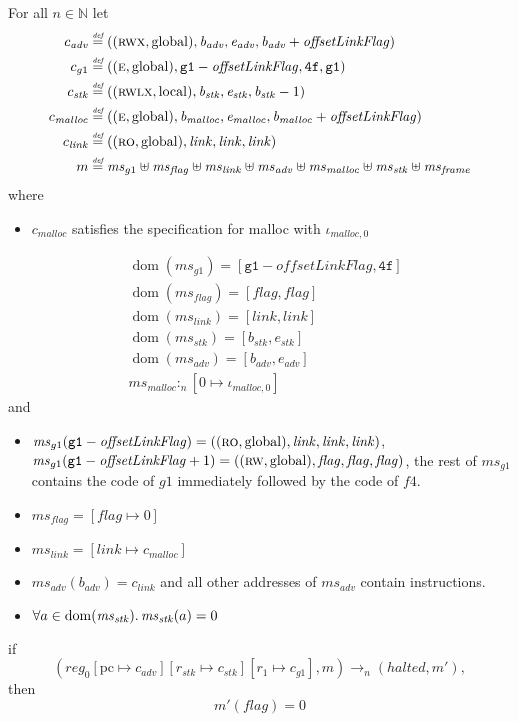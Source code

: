 \documentclass[format=acmsmall, review=true, screen=true]{acmart}
\newcommand{\update}[2]{[#1 \mapsto #2]}
\newcommand{\defeq}{\stackrel{\textit{\tiny{def}}}{=}}
\DeclareMathOperator{\dom}{dom}
\newcommand{\var}[1]{\mathit{#1}}
\newcommand{\hs}{\var{ms}}
\newcommand{\ms}{\hs}
\newcommand{\pcreg}{\mathrm{pc}}
\newcommand{\start}{\var{b}}
\newcommand{\addrend}{\var{e}}
\newcommand{\reg}{\var{reg}}
\newcommand{\heap}{\var{mem}}
\newcommand{\adv}{\var{adv}}
\newcommand{\link}{\var{link}}
\newcommand{\stk}{\var{stk}}
\newcommand{\flag}{\var{flag}}
\newcommand{\pwl}{\var{pwl}}
\newcommand{\olf}{\var{offsetLinkFlag}}
\newcommand{\halted}{\mathit{halted}}
\newcommand{\heapSat}[3][\heap]{#1 :_{#2} #3}
\newcommand{\memSat}[3][n]{\heapSat[#2]{#1}{#3}}
\newcommand{\codelabel}[1]{\mathit{#1}}
\newcommand{\malloc}{\codelabel{malloc}}
\newcommand{\nats}{\mathbb{N}}
\newcommand{\plainperm}[1]{\textsc{#1}}
\newcommand{\readonly}{\plainperm{ro}}
\newcommand{\readwrite}{\plainperm{rw}}
\newcommand{\entry}{\plainperm{e}}
\newcommand{\rwx}{\plainperm{rwx}}
\newcommand{\rwlx}{\plainperm{rwlx}}
\newcommand{\plainlocality}[1]{\mathrm{#1}}
\newcommand{\local}{\plainlocality{local}}
\newcommand{\glob}{\plainlocality{global}}
\newcommand{\step}[1][]{\rightarrow_{#1}}
\begin{document}
 
 \begin{lemma}
  \label{lem:correctness-g1-detailed}
  For all $n \in \nats$
  let
  \begin{align*}
    c_{\var{adv}} & \defeq ((\rwx,\glob),\start_{\adv},\addrend_{\adv},\start_{\adv}+\olf) \\
    c_{g1} & \defeq ((\entry,\glob),\mathtt{g1}-\olf,\mathtt{4f},\mathtt{g1}) \\
    c_\stk & \defeq ((\rwlx,\local),\start_\stk,\addrend_\stk,\start_\stk-1) \\
    c_\malloc & \defeq ((\entry,\glob),\start_\malloc,\addrend_\malloc,\start_\malloc+\olf) \\
    c_\link & \defeq ((\readonly,\glob),\link,\link,\link) \\
    m & \defeq \hs_{g1} \uplus 
        \ms_\flag \uplus                
        \ms_\link \uplus 
        \ms_\adv \uplus 
        \ms_\malloc \uplus 
        \ms_\stk \uplus
        \ms_{\var{frame}} 
  \end{align*}
  where 
  \begin{itemize}
  \item $c_\malloc$ satisfies the specification for malloc with $\iota_{\malloc,0}$
  \end{itemize}
  \begin{align*}
    &\dom(\hs_{g1}) = [\mathtt{g1}-\olf,\mathtt{4f}] \\
    &\dom(\hs_\flag) = [\flag,\flag] \\
    &\dom(\ms_\link) = [\link,\link]\\
    &\dom(\ms_\stk) = [\start_\stk, \addrend_\stk]\\
    &\dom(\hs_{\adv}) = [\start_\adv,\addrend_\adv] \\
    &\heapSat[\hs_{\malloc}]{n}{[0 \mapsto \iota_{\malloc,0}]}
  \end{align*}
  and
  \begin{itemize}
  \item $\ms_{g1}(\mathtt{g1}-\olf) = ((\readonly,\glob),\link,\link,\link)$, $\ms_{g1}(\mathtt{g1}-\olf+1) = ((\readwrite,\glob),\flag,\flag,\flag)$, the rest of $\hs_{g1}$ contains the code of $g1$ immediately followed by the code of $f4$.
  \item $\ms_\flag = [\flag \mapsto 0]$
  \item $\ms_{\var{link}} = [\link \mapsto c_\malloc]$
  \item $\hs_\adv(\start_\adv) = c_\link$ and all other addresses of $\ms_\adv$ contain instructions.
  \item $\forall a \in \dom(\ms_\stk) \ldotp \ms_\stk(a) = 0$ %
  \end{itemize}
  if 
  \[
    (\reg_0\update{\pcreg}{c_\adv}\update{r_\stk}{c_\stk}\update{r_1}{c_{g1}},m) \step[n] (\halted,m'),
  \]
  then
  \[
    m'(\flag) = 0
  \]  
\end{lemma}
\end{document}
